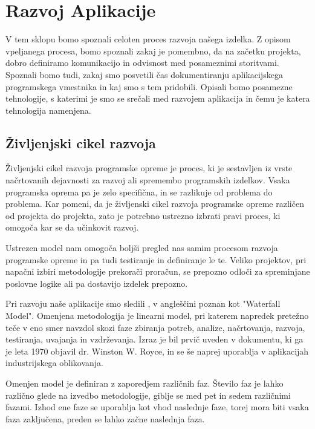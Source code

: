 \documentclass[a4paper, 12pt]{book}
\begin{document}
\chapter{Razvoj Aplikacije}
\label{razvoj}
V tem sklopu bomo spoznali celoten proces razvoja našega izdelka. Z opisom vpeljanega procesa, bomo spoznali zakaj je pomembno, da na začetku projekta, dobro definiramo komunikacijo in odvisnost med posameznimi storitvami. Spoznali bomo tudi, zakaj smo posvetili čas dokumentiranju aplikacijskega programskega vmestnika in kaj smo s tem pridobili. Opisali bomo posamezne tehnologije, s katerimi je smo se srečali med razvojem aplikacija in čemu je katera tehnologija namenjena. 

\section{Življenjski cikel razvoja }
Življenjski cikel razvoja programske opreme je proces, ki je sestavljen iz vrste načrtovanih dejavnosti za razvoj ali spremembo programskih izdelkov. Vsaka programska oprema pa je zelo specifična, in se razlikuje od problema do problema. Kar pomeni, da je življenski cikel razvoja programske opreme različen od projekta do projekta, zato je potrebno ustrezno izbrati pravi proces, ki omogoča kar se da učinkovit razvoj.

Ustrezen model nam omogoča boljši pregled nas samim procesom razvoja programske opreme in pa tudi testiranje in definiranje le te. Veliko projektov, pri napačni izbiri metodologije prekorači proračun, se prepozno odloči za spreminjane poslovne logike ali pa dostavijo izdelek prepozno. 

Pri razvoju naše aplikacije smo sledili , v angleščini poznan kot "Waterfall Model". Omenjena metodologija je linearni model, pri katerem napredek pretežno teče v eno smer navzdol skozi faze zbiranja potreb, analize, načrtovanja, razvoja, testiranja, uvajanja in vzdrževanja. Izraz je bil prvič uveden v dokumentu, ki ga je leta 1970 objavil dr. Winston W. Royce, in se še naprej uporablja v aplikacijah industrijskega oblikovanja. \cite{waterfall-model}

Omenjen model je definiran z zaporedjem različnih faz. Število faz je lahko različno glede na izvedbo metodologije, giblje se med pet in sedem različnimi fazami. Izhod ene faze se uporablja kot vhod naslednje faze, torej mora biti vsaka faza zaključena, preden se lahko začne naslednja faza.
\end{document}
